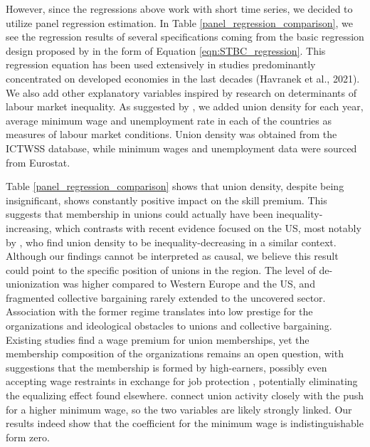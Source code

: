 \documentclass[11pt]{article}
\begin{document}
However, since the regressions above work with short time series, we decided to utilize panel regression estimation. In Table \ref{panel_regression_comparison}, we see the regression results of several specifications coming from the basic regression design proposed by \citet{katz1992changes} in the form of Equation \ref{eqn:STBC_regression}. This regression equation has been used extensively in studies predominantly concentrated on developed economies in the last decades (Havranek et al., 2021). We also add other explanatory variables inspired by research on determinants of labour market inequality. As suggested by \citet{farber2021unions}, we added union density for each year, average minimum wage and unemployment rate in each of the countries as measures of labour market conditions. Union density was obtained from the ICTWSS database, while minimum wages and unemployment data were sourced from Eurostat. %

Table \ref{panel_regression_comparison} shows that union density, despite 
being insignificant, shows constantly positive impact on the skill premium. This suggests that membership in unions could actually have been inequality-increasing, which contrasts with recent evidence focused on the US, most notably by \citet{farber2021unions}, who find union density to be inequality-decreasing in a similar context. Although our findings cannot be interpreted as causal, we believe this result could point to the specific position of unions in the region. The level of de-unionization was higher compared to Western Europe and the US, and fragmented collective bargaining rarely extended to the uncovered sector. Association with the former regime translates into low prestige for the organizations and ideological obstacles to unions and collective bargaining. Existing studies find a wage premium for union memberships, yet the membership composition of the organizations remains an open question, with suggestions that the membership is formed by high-earners, possibly even accepting wage restraints in exchange for job protection \citep{magda2017trade}, potentially eliminating the equalizing effect found elsewhere. \citet{farber2021unions} connect union activity closely with the push for a higher minimum wage, so the two variables are likely strongly linked. Our results indeed show that the coefficient for the minimum wage is indistinguishable form zero.
\end{document}
